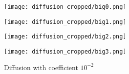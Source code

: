 \begin{figure}[H]
    \centering
    
    \begin{minipage}[t]{.24\linewidth}
        \centering
        \vspace{0pt}
        \texttt{[image: diffusion\_cropped/big0.png]}
    \end{minipage}
    \begin{minipage}[t]{.24\linewidth}
        \centering
        \vspace{0pt}
        \texttt{[image: diffusion\_cropped/big1.png]}
    \end{minipage}
    \begin{minipage}[t]{.24\linewidth}
        \centering
        \vspace{0pt}
        \texttt{[image: diffusion\_cropped/big2.png]}
    \end{minipage}
    \begin{minipage}[t]{.24\linewidth}
        \centering
        \vspace{0pt}
        \texttt{[image: diffusion\_cropped/big3.png]}
    \end{minipage}

    \caption{Diffusion with coefficient $10^{-2}$}
    \label{diffusion 1e-2}
\end{figure}

